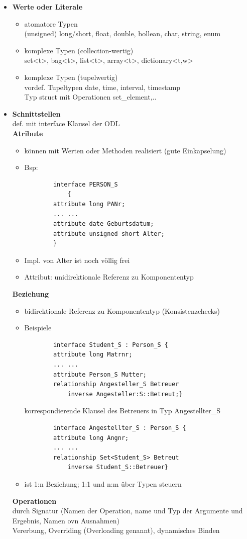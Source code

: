 \begin{itemize}
	\item \textbf{Werte oder Literale}
	\begin{itemize}
		\item atomatore Typen\\
		(unsigned) long/short, float, double, bollean, char, string, enum
		
		\item komplexe Typen (collection-wertig)\\
		set<t>, bag<t>, list<t>, array<t>, dictionary<t,w>
		
		\item komplexe Typen (tupelwertig)\\
		vordef. Tupeltypen date, time, interval, timestamp\\
		Typ struct mit Operationen set\_element,..
	\end{itemize}
	
	\item \textbf{Schnittstellen}\\
	def. mit interface Klausel der ODL\\
	\textbf{Atribute}
	\begin{itemize}
		\item können mit Werten oder Methoden realisiert (gute Einkapselung)
		\item Bsp:
		\begin{lstlisting}
		interface PERSON_S
			{
		attribute long PANr;
		...	...
		attribute date Geburtsdatum;
		attribute unsigned short Alter;
		}
		\end{lstlisting}
		\item Impl. von Alter ist noch völlig frei
		\item Attribut: unidirektionale Referenz zu Komponententyp
	\end{itemize}
	\textbf{Beziehung}
	\begin{itemize}
		\item bidirektionale Referenz zu Komponententyp (Konsistenzchecks)
		\item Beispiele
		\begin{lstlisting}
		interface Student_S : Person_S {
		attribute long Matrnr;
		...	...
		attribute Person_S Mutter;
		relationship Angesteller_S Betreuer
			inverse Angesteller:S::Betreut;}
		\end{lstlisting}
		korrespondierende Klausel des Betreuers in Typ Angestellter\_S
		\begin{lstlisting}
		interface Angestellter_S : Person_S {
		attribute long Angnr;
		...	...
		relationship Set<Student_S> Betreut
			inverse Student_S::Betreuer}
		\end{lstlisting}
		
		\item ist 1:n Beziehung; 1:1 und n:m über Typen steuern
	\end{itemize}
	
	\textbf{Operationen}\\
	durch Signatur (Namen der Operation, name und Typ der Argumente und Ergebnis, Namen ovn Ausnahmen)\\
	Vererbung, Overriding (Overloading genannt), dynamisches Binden
\end{itemize}

